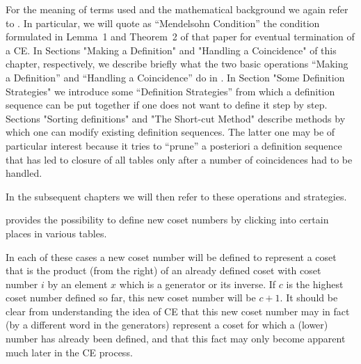 



For the meaning of terms used and the mathematical background we again
refer to \cite{Neu82}.
In particular, we will quote as ``Mendelsohn Condition'' the condition
formulated in Lemma~1 and Theorem~2 of that paper for eventual
termination of a CE.
In Sections "Making a Definition" and
"Handling a Coincidence" of this chapter, respectively, we describe
briefly what the two basic operations ``Making a Definition'' and
``Handling a Coincidence'' do in {\ITC}. In Section "Some Definition
Strategies" we introduce some ``Definition Strategies'' from which a
definition sequence can be put together if one does not want to define
it step by step. Sections "Sorting definitions" and "The Short-cut
Method" describe methods by which one can modify existing definition
sequences. The latter one may be of particular interest because it
tries to ``prune'' a posteriori a definition sequence that has led to
closure of all tables only after a number of coincidences had to be
handled.

In the subsequent chapters we will then refer to these operations and
strategies.




{\ITC} provides the possibility to define new coset numbers by
clicking into certain places in various tables.

In each of these cases a new coset number will be defined to represent
a coset that is the product (from the right) of an already defined
coset with coset number $i$ by an element $x$ which is a generator or
its inverse. If $c$ is the highest coset number defined so far, this
new coset number will be $c+1$. It should be clear from understanding
the idea of CE that this new coset number may in fact (by a different
word in the generators) represent a coset for which a (lower) number
has already been defined, and that this fact may only become apparent
much later in the CE process.

